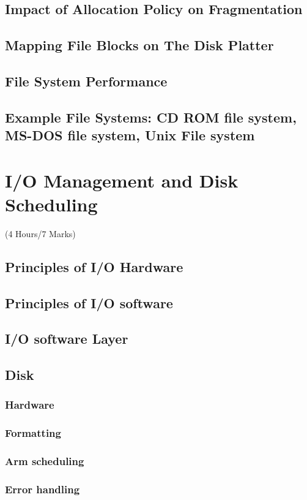 \documentclass[12pt]{article}
\begin{document}
\subsection{Impact of Allocation Policy on Fragmentation}
\subsection{Mapping File Blocks on The Disk Platter}
\subsection{File System Performance}
\subsection{Example File Systems: CD ROM file system, MS-DOS file system, Unix File system}

\pagebreak
\section{I/O Management and Disk Scheduling}
\begin{center}(4 Hours/7 Marks)\end{center}
\subsection{Principles of I/O Hardware}
\subsection{Principles of I/O software}
\subsection{I/O software Layer}
\subsection{Disk}
\subsubsection{Hardware}
\subsubsection{Formatting}
\subsubsection{Arm scheduling}
\subsubsection{Error handling}
\end{document}
